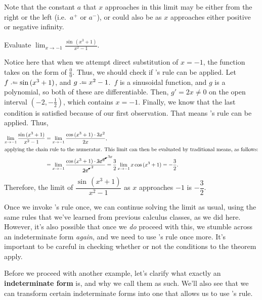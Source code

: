 Note that the constant \(a\) that \(x\) approaches in this limit may be either from the right or the left (i.e.\ \(a^+\) or \(a^-\)), or could also be as \(x\) 
approaches either positive or negative infinity.\par 
\begin{example}
    Evaluate \(\displaystyle{} \lim_{x\to -1} \frac{\sin \,(x^3 + 1)}{x^2 -1 }\).\par 
    Notice here that when we attempt direct substitution of \(x = -1 \), the function takes on the form of \(\frac{0}{0}\). Thus, we should check if \lh's rule can be applied. 
    Let \(f \defeq \sin\, (x^3 + 1)\), and \( g \defeq x^2 - 1\).\ \(f\) is a sinusoidal function, and \(g\) is a polynomial, so both of these are differentiable. Then, \(g' = 2x \neq 0\) on 
    the open interval \((-2, -\frac{1}{2})\), which contains \(x = -1\). Finally, we know that the last condition is satisfied because of our first observation. That means \lh's rule 
    can be applied. Thus,\begin{align*}
        \lim_{x\to -1} \frac{\sin \,(x^3 + 1)}{x^2 -1 } &= \lim_{x \to -1} \frac{\cos \, (x^3 + 1) \cdot 3x^2}{2x},\\ 
        \intertext{applying the chain rule to the numerator. This limit can then be evaluated by traditional means, as follows:}
        &= \lim_{x \to -1} \frac{\cos \, (x^3 + 1) \cdot \cancelto{3x}{3x^2}}{\cancelto{2}{2x}} = \frac{3}{2} \lim_{x\to -1} x \cos\, (x^3 + 1) = -\frac{3}{2}. 
    \end{align*}
    Therefore, the limit of \(\dfrac{\sin \,(x^3 + 1)}{x^2 -1 }\) as \(x\) approaches \(-1\) is \(-\dfrac{3}{2}\). 
\end{example} 
Once we invoke \lh's rule once, we can continue solving the limit as usual, using the same rules that we've learned from previous calculus classes, as we did here. However, it's also 
possible that once we \textit{do} proceed with this, we stumble across an indeterminate form \textit{again}, and we need to use \lh's rule once more. It's important to be 
careful in checking whether or not the conditions to the theorem apply.\par 
Before we proceed with another example, let's clarify what exactly an \textbf{indeterminate form} is, and why we call them as such. We'll also see that we can transform certain indeterminate forms 
into one that allows us to use \lh's rule.
